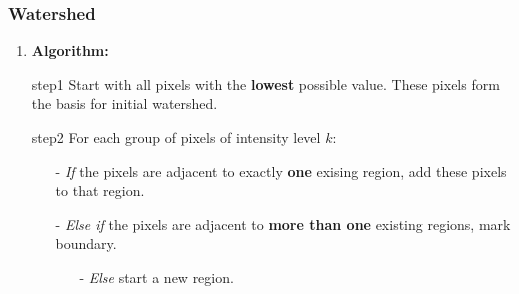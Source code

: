 \documentclass[notheorems,mathserif,table,compress]{beamer}  %
\begin{document}
\begin{frame}
    \frametitle{Watershed}
    \begin{enumerate}[{\color{black}{\Large (B)}}]
    \item  \textbf{\Large Algorithm:}
    \end{enumerate}
        \begin{itemize}
        \item[step1] Start with all pixels with the {\textbf{lowest}} possible value. These pixels form the basis for initial watershed.
        \item[step2] For each group of pixels of intensity level $k:$ %
	     \begin{itemize}
             \item[-] \emph{If} the pixels are adjacent to exactly {\textbf{one}} exising region, add these pixels to that region. 
             \item[-] \emph{Else if} the pixels are adjacent to {\textbf{more than one}} existing regions, mark boundary. 
	           \begin{itemize}
		   \item[-] \emph{Else} start a new region.
		   \end{itemize}
             \end{itemize}
        \end{itemize}
\end{frame}
\end{document}
